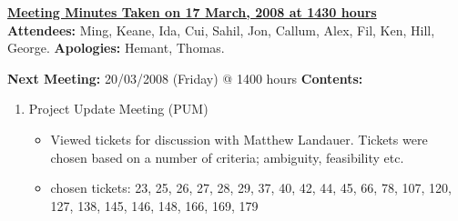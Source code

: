 \documentclass{letter}
\begin{document}
{\large \textbf{\underline{Meeting Minutes Taken on 17 March, 2008 at 1430 hours}}}\\

\textbf{Attendees:} Ming, Keane, Ida, Cui, Sahil, Jon, Callum, Alex, Fil, Ken, Hill, George.
\textbf{Apologies:} Hemant, Thomas.

\textbf{Next Meeting:} 20/03/2008 (Friday) @ 1400 hours
\textbf{Contents:}

\begin{enumerate}
\item Project Update Meeting (PUM)
	\begin{itemize}
	\item Viewed tickets for discussion with Matthew Landauer. Tickets were chosen based on a number of criteria; ambiguity, feasibility etc.
	\item chosen tickets: 23, 25, 26, 27, 28, 29, 37, 40, 42, 44, 45, 66, 78, 107, 120, 127, 138, 145, 146, 148, 166, 169, 179
	\end{itemize} 
\end{enumerate} 
\end{document}

